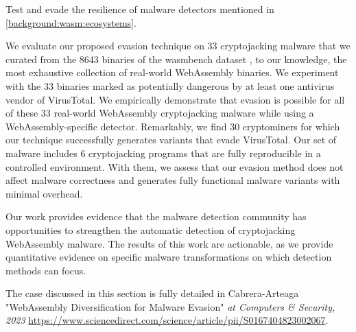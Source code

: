 
Test and evade the resilience of \Wasm malware detectors mentioned in \autoref{background:wasm:ecosystems}.




We evaluate our proposed evasion technique on 33 cryptojacking malware that we curated from the 8643 binaries of the wasmbench dataset \cite{Hilbig2021AnES}, to our knowledge, the most exhaustive collection of real-world WebAssembly binaries.
We experiment with the 33 binaries marked as potentially dangerous by at least one antivirus vendor of VirusTotal.
We empirically demonstrate that evasion is possible for all of these 33 real-world WebAssembly cryptojacking malware while using a WebAssembly-specific detector. 
Remarkably, we find 30 cryptominers for which our technique successfully generates variants that evade VirusTotal.
Our set of malware includes 6 cryptojacking programs that are fully reproducible in a controlled environment. 
With them, we assess that our evasion method does not affect malware correctness and generates fully functional malware variants with minimal overhead.

Our work provides evidence that the malware detection community has opportunities to strengthen the automatic detection of cryptojacking WebAssembly malware. 
The results of this work are actionable, as we provide quantitative evidence on specific malware transformations on which detection methods can focus.








\begin{tcolorbox}[title=Contribution paper,boxrule=1pt,arc=.2em,boxsep=1.0mm]
    The case discussed in this section is fully detailed in Cabrera-Arteaga \etal "WebAssembly Diversification for Malware Evasion"
    \emph{at Computers \& Security, 2023}
    \url{https://www.sciencedirect.com/science/article/pii/S0167404823002067}. 
\end{tcolorbox}


